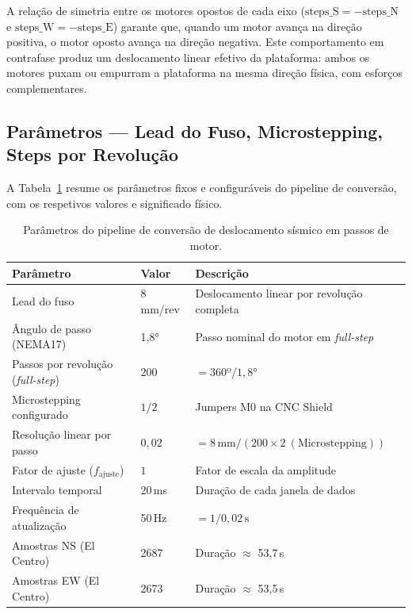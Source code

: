A relação de simetria entre os motores opostos de cada eixo ($\text{steps\_S} = -\text{steps\_N}$ e $\text{steps\_W} = -\text{steps\_E}$) garante que, quando um motor avança na direção positiva, o motor oposto avança na direção negativa. Este comportamento em contrafase produz um deslocamento linear efetivo da plataforma: ambos os motores puxam ou empurram a plataforma na mesma direção física, com esforços complementares.


\subsection{Parâmetros --- Lead do Fuso, Microstepping, Steps por Revolução}
\label{subsec:parametros-conversao}

A Tabela~\ref{tab:parametros-conversao} resume os parâmetros fixos e configuráveis do pipeline de conversão, com os respetivos valores e significado físico.

\begin{table}[h]
\centering
\caption{Parâmetros do pipeline de conversão de deslocamento sísmico em passos de motor.}
\label{tab:parametros-conversao}
\begin{tabular}{lll}
\hline
\textbf{Parâmetro} & \textbf{Valor} & \textbf{Descrição} \\
\hline
Lead do fuso & 8\,mm/rev & Deslocamento linear por revolução completa \\
Ângulo de passo (NEMA17) & 1,8° & Passo nominal do motor em \textit{full-step} \\
Passos por revolução (\textit{full-step}) & 200 & $= 360º / 1{,}8°$ \\
Microstepping configurado & $1/2$ & Jumpers M0 na CNC Shield \\
Resolução linear por passo & $0{,}02$ & $= 8\,\text{mm} / (200 \times 2\ ({\text{Microstepping}}))$ \\
Fator de ajuste ($f_{\text{ajuste}}$) & $1$ & Fator de escala da amplitude \\
Intervalo temporal & 20\,ms & Duração de cada janela de dados \\
Frequência de atualização & 50\,Hz & $= 1 / 0{,}02\,\text{s}$ \\
Amostras NS (El Centro) & 2687 & Duração $\approx$ 53,7\,s \\
Amostras EW (El Centro) & 2673 & Duração $\approx$ 53,5\,s \\
\hline
\end{tabular}
\end{table}


